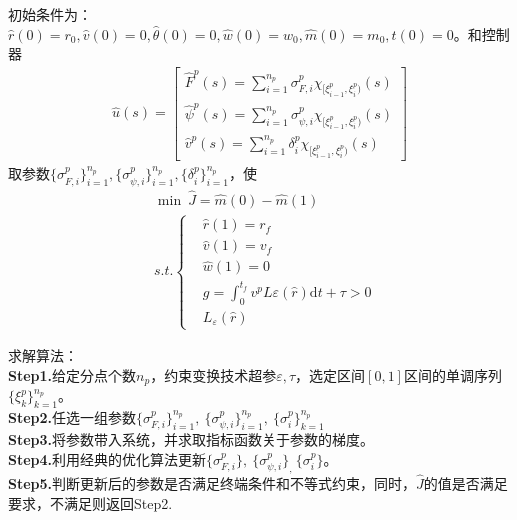            初始条件为：$\hat{r}(0) = r_0,\hat{v}(0)=0,\hat{\theta}(0)=0,\hat{w}(0)=w_0,\hat{m}(0)=m_0,t(0)=0$。和控制器
            \begin{align*}
            \hat{u}(s) =
            \left[
            \begin{aligned}
            \hat{F}^p(s) = \sum_{i=1}^{n_p}\sigma_{F,i}^p\chi_{[\xi_{i-1}^p,\xi_i^p)}(s)\\
            \hat{\psi}^p(s) = \sum_{i=1}^{n_p}\sigma_{\psi,i}^p\chi_{[\xi_{i-1}^p,\xi_i^p)}(s)\\
            \hat{v}^p(s) = \sum_{i=1}^{n_p}\delta_i^p\chi_{[\xi_{i-1}^p,\xi_i^p)}(s)
            \end{aligned}
            \right]
            \end{align*}
            取参数$\{\sigma_{F,i}^p\}_{i=1}^{n_p},\{\sigma_{\psi,i}^p\}_{i=1}^{n_p},\{\delta_{i}^p\}_{i=1}^{n_p}$，使
            \begin{align*}
            & \min\ \hat{J} = \hat{m}(0) - \hat{m}(1)\\
            & s.t.\left\{\begin{aligned}
            & \hat{r}(1) = r_f\\
            & \hat{v}(1) = v_f\\
            & \hat{w}(1) = 0\\
            & g=\int_0^{t_f}v^pL\varepsilon(\hat{r})\mathrm{d}t+\tau >0\\
            & L_\varepsilon(\hat{r})
            \end{aligned}
            \right.
            \end{align*}
            \par
            求解算法：\\
            \textbf{Step1.}给定分点个数$n_p$，约束变换技术超参$\varepsilon,\tau$，选定区间$[0,1]$区间的单调序列$\{\xi_k^p\}_{k=1}^{n_p}$。\\
            \textbf{Step2.}任选一组参数$\{\sigma_{F,i}^p\}_{i=1}^{n_p},\ \{\sigma_{\psi,i}^p\}_{i=1}^{n_p},\ \{\sigma_i^p\}_{k=1}^{n_p}$\\
            \textbf{Step3.}将参数带入系统，并求取指标函数关于参数的梯度。\\
            \textbf{Step4.}利用经典的优化算法更新$\{\sigma_{F,i}^p\},\ \{\sigma_{\psi,i}^p\}_,\ \{\sigma_i^p\}$。\\
            \textbf{Step5.}判断更新后的参数是否满足终端条件和不等式约束，同时，$\hat{J}$的值是否满足要求，不满足则返回Step2.

